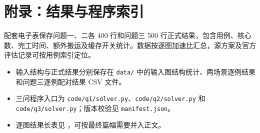 \documentclass[UTF8,a4paper,zihao=-4,fontset=fandol]{ctexart}
\numberwithin{equation}{section}
\numberwithin{figure}{section}
\numberwithin{table}{section}
\begin{document}

\clearpage











\section*{附录：结果与程序索引}
配套电子表保存问题一、二各 400 行和问题三 500 行正式结果，包含用例、核心数、完工时间、额外搬运及缓存开关统计。数据按逐图加速比汇总，源方案及官方评估记录可按用例索引定位。

\begin{itemize}[nosep,leftmargin=2em]
\item 输入结构与正式结果分别保存在 \texttt{data/} 中的输入图结构统计、两场景逐例结果和问题三逐例配对结果 CSV 文件。
\item 三问程序入口为 \texttt{code/q1/solver.py}、\texttt{code/q2/solver.py} 和 \texttt{code/q3/solver.py}；版本校验见 \texttt{manifest.json}。
\item 逐图结果长表见 ，可按最终篇幅需要并入正文。
\end{itemize}

% 
\end{document}
